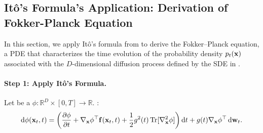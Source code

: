 




\subsection{It\^o's Formula's Application: Derivation of Fokker-Planck Equation}\label{subsec:rigorous-proof-fpe}
In this section, we apply It\^o's formula from  to derive the Fokker–Planck equation, a PDE that characterizes the time evolution of the probability density $ p_t({\mathbf{x}}) $ associated with the $ D $-dimensional diffusion process defined by the SDE in .

\paragraph{Step 1: Apply It\^o's Formula.}
Let  be a  $\phi \colon \mathbb{R}^D \times [0, T] \to \mathbb{R}$. :
\[
\mathop{}\!\mathrm{d} \phi({\mathbf{x}}_t, t) = \left( \frac{\partial \phi}{\partial t} + \nabla_{{\mathbf{x}}} \phi^\top {\mathbf{f}}({\mathbf{x}}_t, t) + \frac{1}{2} g^2(t) \operatorname{Tr}[\nabla_{{\mathbf{x}}}^2 \phi] \right) \mathop{}\!\mathrm{d} t + g(t) \nabla_{{\mathbf{x}}} \phi^\top \mathop{}\!\mathrm{d} {\mathbf{w}}_t.
\]
